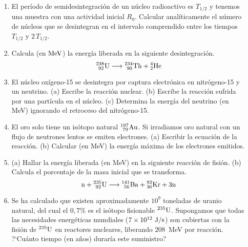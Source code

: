 \documentclass[11pt]{articulo}
\begin{document}
\begin{enumerate}
\item El per\'iodo de semidesintegraci\'on de un n\'ucleo radioactivo es $T_{1/2}$ y tenemos una muestra con una actividad inicial $R_0$. Calcular anal\'iticamente el n\'umero de n\'ucleos que se desintegran en el intervalo comprendido entre los tiempos $T_{1/2}$ y $2 \,T_{1/2}$.

\item Calcula (en ${\rm MeV}$) la energ\'ia liberada en la siguiente desintegraci\'on.
%
\begin{equation*}
{\rm {_{~92}^{238}U} \longrightarrow {_{~90}^{234}Th} + {_2^4He}}
\end{equation*}

\item El n\'ucleo ox\'igeno-15 se desintegra por captura electr\'onica en nitr\'ogeno-15 y un neutrino. (a) Escribe la reacci\'on nuclear. (b) Escribe la reacci\'on sufrida por una part\'icula en el n\'ucleo. (c) Determina la energ\'ia del neutrino (en MeV) ignorando el retroceso del nitr\'ogeno-15. 

\item El oro solo tiene un is\'otopo natural $_{~79}^{197}{\rm Au}$. Si irradiamos oro natural con un flujo de neutrones lentos se emiten electrones. (a) Escribir la ecuaci\'on de la reacci\'on. (b) Calcular (en MeV) la energ\'ia m\'axima de los electrones emitidos.

\item (a) Hallar la energ\'ia liberada (en MeV) en la siguiente reacci\'on de fisi\'on. (b) Calcula el porcentaje de la masa inicial que se transforma.
%
\begin{equation*}
{\rm n + {_{~92}^{235}U} \longrightarrow {_{~56}^{141}Ba} + {_{36}^{92}Kr} + 3n}
\end{equation*}

\item Se ha calculado que existen aproximadamente $10^9$ toneladas de uranio natural, del cual el $0,7\%$ es el is\'otopo fisionable $^{235}{\rm U}$. Supongamos que todas las necesidades energ\'eticas mundiales ($7 \times 10^{12}~{\rm J/s}$) son cubiertas con la fisi\'on de $^{235}{\rm U}$ en reactores nucleares, liberando 208~MeV por reacci\'on. ?`Cu\'anto tiempo (en a\~nos) durar\'ia este suministro?

\end{enumerate}


\vspace*{0.25cm}
\end{document}
